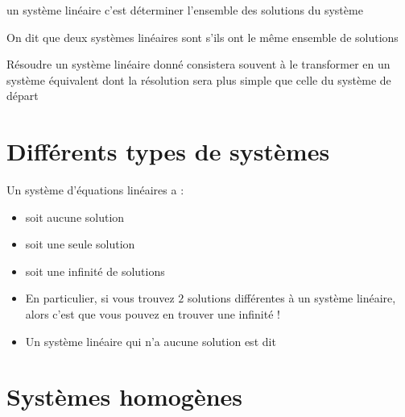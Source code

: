 \begin{frame}

 un système linéaire c'est déterminer l'ensemble 
des solutions du système

\pause

\begin{mydefinition}
\label{systemes equivalents}
On dit que deux systèmes linéaires sont  
s'ils ont le même ensemble de solutions
\end{mydefinition}

\pause
\bigskip

Résoudre un système linéaire 
donné consistera souvent à le transformer en un système équivalent dont 
la résolution sera plus simple que celle du système de départ

\end{frame}

\section{Différents types de systèmes}

\begin{frame}

\begin{theoreme}
Un système d'équations linéaires a :
\begin{itemize}
  \item soit aucune solution
  \item soit une seule solution
  \item soit une infinité de solutions
\end{itemize}
\end{theoreme}

\pause

\begin{itemize}
  \item En particulier, si vous trouvez $2$ solutions différentes à un système
linéaire, alors c'est que vous pouvez en trouver une infinité !

\pause

  \item Un système linéaire qui n'a aucune solution est dit 
\end{itemize}

\end{frame}


\section{Systèmes homogènes}

